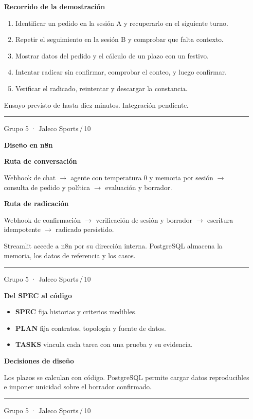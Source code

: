 \documentclass[11pt]{article}
\newenvironment{slide}[1]{%
  \thispagestyle{empty}%
  \begin{minipage}[t][0.97\textheight][t]{\textwidth}%
  \begingroup\setlength{\fboxsep}{6pt}%
  \colorbox{Pino}{\parbox{\dimexpr\linewidth-2\fboxsep\relax}{\color{white}\Large\bfseries #1}}%
  \endgroup\par\medskip
}{%
  \par\vfill\hrule\smallskip
  {\scriptsize Grupo 5 · Jaleco Sports\hfill\thepage\,/\,10}\par
  \end{minipage}\newpage
}
\newenvironment{block}[1]{%
  \par\medskip\textcolor{Mineral}{\bfseries #1}\par\smallskip
}{\par\medskip}
\begin{document}
\begin{slide}{Recorrido de la demostración}
  \begin{enumerate}
    \item Identificar un pedido en la sesión A y recuperarlo en el siguiente turno.
    \item Repetir el seguimiento en la sesión B y comprobar que falta contexto.
    \item Mostrar datos del pedido y el cálculo de un plazo con un festivo.
    \item Intentar radicar sin confirmar, comprobar el conteo, y luego confirmar.
    \item Verificar el radicado, reintentar y descargar la constancia.
  \end{enumerate}
  \medskip Ensayo previsto de hasta diez minutos. Integración pendiente.
\end{slide}

\begin{slide}{Diseño en n8n}
  \begin{block}{Ruta de conversación}
    Webhook de chat $\rightarrow$ agente con temperatura 0 y memoria por sesión $\rightarrow$ consulta de pedido y política $\rightarrow$ evaluación y borrador.
  \end{block}
  \begin{block}{Ruta de radicación}
    Webhook de confirmación $\rightarrow$ verificación de sesión y borrador $\rightarrow$ escritura idempotente $\rightarrow$ radicado persistido.
  \end{block}
  \medskip Streamlit accede a n8n por su dirección interna. PostgreSQL almacena la memoria, los datos de referencia y los casos.
\end{slide}

\begin{slide}{Del SPEC al código}
  \begin{itemize}
    \item \textbf{SPEC} fija historias y criterios medibles.
    \item \textbf{PLAN} fija contratos, topología y fuente de datos.
    \item \textbf{TASKS} vincula cada tarea con una prueba y su evidencia.
  \end{itemize}
  \begin{block}{Decisiones de diseño}
    Los plazos se calculan con código. PostgreSQL permite cargar datos reproducibles e imponer unicidad sobre el borrador confirmado.
  \end{block}
\end{slide}
\end{document}
